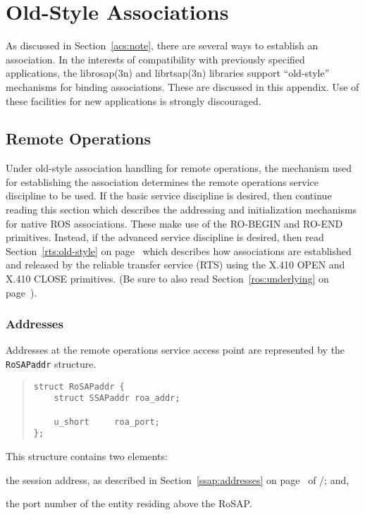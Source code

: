 
\chapter	{Old-Style Associations}\label{old-style}
As discussed in Section~\ref{acs:note},
there are several ways to establish an association.
In the interests of compatibility with previously specified applications,
the \man librosap(3n) and \man librtsap(3n) libraries support ``old-style''
mechanisms for binding associations.
These are discussed in this appendix.
Use of these facilities for new applications is strongly discouraged.

\section	{Remote Operations}\label{ros:old-style}
Under old-style association handling for remote operations,
the mechanism used for establishing the association determines the
remote operations service discipline to be used.
If the basic service discipline is desired,
then continue reading this section which describes the addressing and
initialization mechanisms for native ROS associations.
These make use of the {\sf RO-BEGIN\/} and {\sf RO-END\/} primitives.
Instead,
if the advanced service discipline is desired,
then read Section~\ref{rts:old-style} on page~\pageref{rts:old-style}
which describes how
associations are established and released by the reliable transfer service
(RTS) using the {\sf X.410 OPEN\/} and {\sf X.410 CLOSE\/} primitives.
(Be sure to also read Section~\ref{ros:underlying} on
page~\pageref{ros:underlying}).

\subsection	{Addresses}
Addresses at the remote operations service access point are represented by the
\verb"RoSAPaddr" structure.
\begin{quote}\small\begin{verbatim}
struct RoSAPaddr {
    struct SSAPaddr roa_addr;

    u_short     roa_port;
};
\end{verbatim}\end{quote}
This structure contains two elements:
\begin{describe}
\item[\verb"roa\_addr":]	the session address,
as described in Section~\ref{ssap:addresses} on page~\pageref{ssap:addresses}
of \voltwo/;
and,

\item[\verb"roa\_port":] the port number of the entity residing above the
RoSAP.
\end{describe}

